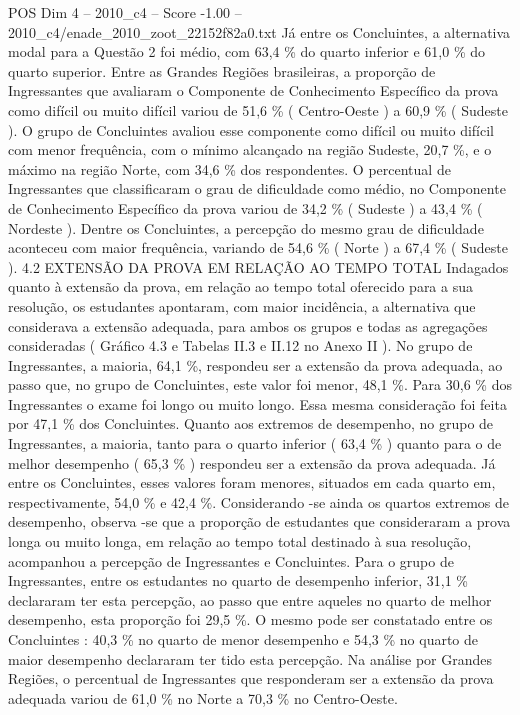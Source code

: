 \begin{textsample}{POS Dim 4 – 2010\_c4 – Score -1.00 – 2010\_c4/enade\_2010\_zoot\_22152f82a0.txt}
Já entre os Concluintes, a alternativa modal para a Questão 2 foi médio, com 63,4 \% do quarto inferior e 61,0 \% do quarto superior.
Entre as Grandes Regiões brasileiras, a proporção de Ingressantes que avaliaram o Componente de Conhecimento Específico da prova como difícil ou muito difícil variou de 51,6 \% ( Centro-Oeste ) a 60,9 \% ( Sudeste ).
O grupo de Concluintes avaliou esse componente como difícil ou muito difícil com menor frequência, com o mínimo alcançado na região Sudeste, 20,7 \%, e o máximo na região Norte, com 34,6 \% dos respondentes.
O percentual de Ingressantes que classificaram o grau de dificuldade como médio, no Componente de Conhecimento Específico da prova variou de 34,2 \% ( Sudeste ) a 43,4 \% ( Nordeste ).
Dentre os Concluintes, a percepção do mesmo grau de dificuldade aconteceu com maior frequência, variando de 54,6 \% ( Norte ) a 67,4 \% ( Sudeste ). 4.2 EXTENSÃO DA PROVA EM RELAÇÃO AO TEMPO TOTAL Indagados quanto à extensão da prova, em relação ao tempo total oferecido para a sua resolução, os estudantes apontaram, com maior incidência, a alternativa que considerava a extensão adequada, para ambos os grupos e todas as agregações consideradas ( Gráfico 4.3 e Tabelas II.3 e II.12 no Anexo II ).
No grupo de Ingressantes, a maioria, 64,1 \%, respondeu ser a extensão da prova adequada, ao passo que, no grupo de Concluintes, este valor foi menor, 48,1 \%.
Para 30,6 \% dos Ingressantes o exame foi longo ou muito longo.
Essa mesma consideração foi feita por 47,1 \% dos Concluintes.
Quanto aos extremos de desempenho, no grupo de Ingressantes, a maioria, tanto para o quarto inferior ( 63,4 \% ) quanto para o de melhor desempenho ( 65,3 \% ) respondeu ser a extensão da prova adequada.
Já entre os Concluintes, esses valores foram menores, situados em cada quarto em, respectivamente, 54,0 \% e 42,4 \%.
Considerando -se ainda os quartos extremos de desempenho, observa -se que a proporção de estudantes que consideraram a prova longa ou muito longa, em relação ao tempo total destinado à sua resolução, acompanhou a percepção de Ingressantes e Concluintes.
Para o grupo de Ingressantes, entre os estudantes no quarto de desempenho inferior, 31,1 \% declararam ter esta percepção, ao passo que entre aqueles no quarto de melhor desempenho, esta proporção foi 29,5 \%.
O mesmo pode ser constatado entre os Concluintes : 40,3 \% no quarto de menor desempenho e 54,3 \% no quarto de maior desempenho declararam ter tido esta percepção.
Na análise por Grandes Regiões, o percentual de Ingressantes que responderam ser a extensão da prova adequada variou de 61,0 \% no Norte a 70,3 \% no Centro-Oeste.

\end{textsample}
